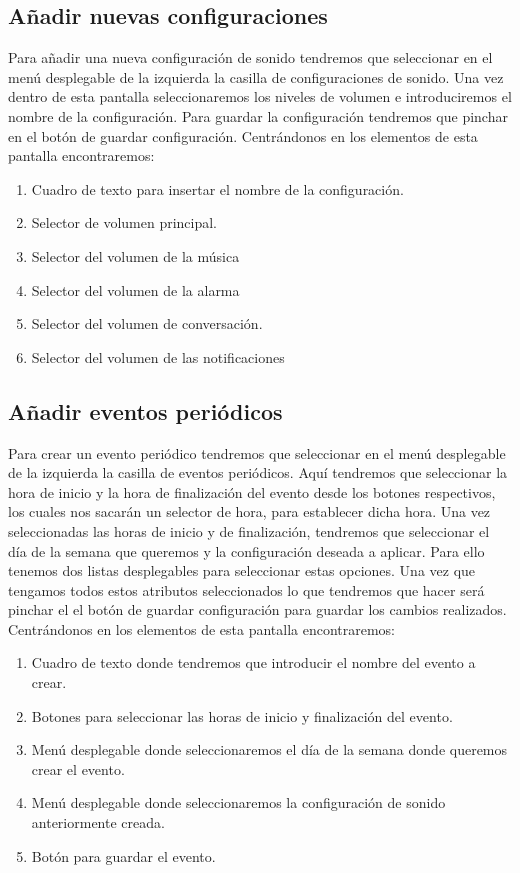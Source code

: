 \subsection{Añadir nuevas configuraciones}
Para añadir una nueva configuración de sonido tendremos que seleccionar en el menú desplegable de la izquierda la casilla de configuraciones de sonido.
Una vez dentro de esta pantalla seleccionaremos los niveles de volumen e introduciremos el nombre de la configuración.
Para guardar la configuración tendremos que pinchar en el botón de guardar configuración.
Centrándonos en los elementos de esta pantalla encontraremos:
\begin{enumerate}
\item Cuadro de texto para insertar el nombre de la configuración.
\item Selector de volumen principal.
\item Selector del volumen de la música
\item Selector del volumen de la alarma
\item Selector del volumen de conversación.
\item Selector del volumen de las notificaciones
\end{enumerate}

\subsection{Añadir eventos periódicos}
Para crear un evento periódico tendremos que seleccionar en el menú desplegable de la izquierda la casilla de eventos periódicos.
Aquí tendremos que seleccionar la hora de inicio y la hora de finalización del evento desde los botones respectivos, los cuales nos sacarán un selector de hora, para establecer dicha hora.
Una vez seleccionadas las horas de inicio y de finalización, tendremos que seleccionar el día de la semana que queremos y la configuración deseada a aplicar. Para ello tenemos dos listas desplegables para seleccionar estas opciones.
Una vez que tengamos todos estos atributos seleccionados lo que tendremos que hacer será pinchar el el botón de guardar configuración para guardar los cambios realizados.
Centrándonos en los elementos de esta pantalla encontraremos:
\begin{enumerate}
\item Cuadro de texto donde tendremos que introducir el nombre del evento a crear.
\item Botones para seleccionar las horas de inicio y finalización del evento.
\item Menú desplegable donde seleccionaremos el día de la semana donde queremos crear el evento.
\item Menú desplegable donde seleccionaremos la configuración de sonido anteriormente creada.
\item Botón para guardar el evento.
\end{enumerate}

